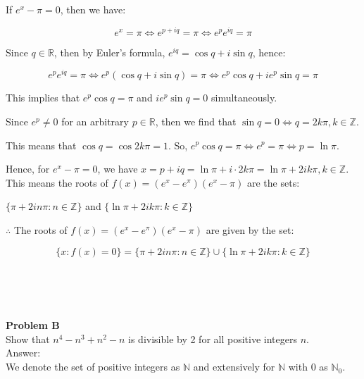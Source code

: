 \documentclass[12pt, letterpaper]{report}
\begin{document}
If $e^x - \pi = 0$, then we have:

\begin{equation*}
e^x = \pi \Leftrightarrow e^{p+iq} = \pi \Leftrightarrow e^p e^{iq} = \pi
\end{equation*}

Since $q\in\mathbb{R}$, then by Euler's formula, $e^{iq} = \cos{q} + i\sin{q}$, hence:

\begin{equation*}
e^p e^{iq} = \pi \Leftrightarrow e^p(\cos{q} + i\sin{q}) = \pi \Leftrightarrow e^p \cos{q} + ie^p \sin{q} = \pi
\end{equation*}

This implies that $e^p \cos{q} = \pi$ and $ie^p \sin{q} = 0$ simultaneously.

Since $e^p\neq 0$ for an arbitrary $p\in\mathbb{R}$, then we find that $\sin{q}=0\Leftrightarrow q = 2k\pi, k\in\mathbb{Z}$.

This means that $\cos{q} = \cos{2k\pi} = 1$. So, $e^p\cos{q} = \pi\Leftrightarrow e^{p} = \pi\Leftrightarrow p = \ln{\pi}$.

Hence, for $e^x - \pi = 0$, we have $x = p + iq = \ln{\pi} + i\cdot 2k\pi = \ln{\pi} + 2ik\pi, k\in\mathbb{Z}$.\\

This means the roots of $f(x) = (e^x - e^\pi)(e^x - \pi)$ are the sets:

{\centering
	$\{\pi + 2in\pi: n\in\mathbb{Z}\}${ } and { }$\{\ln{\pi} + 2ik\pi: k\in\mathbb{Z}\}$
\par}

\bigskip

$\therefore$ The roots of $f(x) = (e^x - e^\pi)(e^x - \pi)$ are given by the set:

\begin{equation*}
\{x: f(x) = 0\} = \{\pi + 2in\pi: n\in\mathbb{Z}\} \cup \{\ln{\pi} + 2ik\pi: k\in\mathbb{Z}\}
\end{equation*}

\makebox[\linewidth]{\rule{\textwidth}{0.4pt}}\\

\newpage

\makebox[\linewidth]{\rule{\textwidth}{0.4pt}}\\
\\\textbf{Problem B}\\
Show that $n^4 - n^3 + n^2 - n$ is divisible by 2 for all positive integers $n$.\\

Answer:\\
We denote the set of positive integers as $\mathbb{N}$ and extensively for $\mathbb{N}$ with 0 as $\mathbb{N}_0$.
\end{document}
